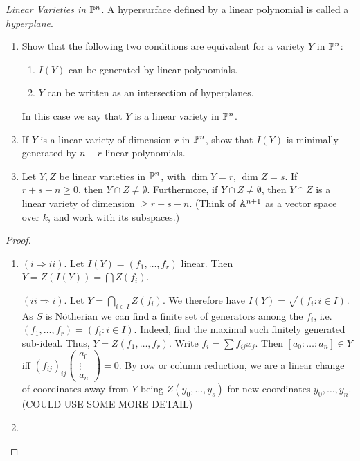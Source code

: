 \label{1.2.11}

\textit{Linear Varieties in} $\P^n$. A hypersurface defined by a linear polynomial is called a \textit{hyperplane}.

\begin{enumerate}[label = (\alph*)]
    \item Show that the following two conditions are equivalent for a variety $Y$ in $\P^n$:
    \begin{enumerate}[label = (\roman*)]
        \item $I(Y)$ can be generated by linear polynomials.
        \item $Y$ can be written as an intersection of hyperplanes.
    \end{enumerate}
    In this case we say that $Y$ is a linear variety in $\P^n$.
    
    \item If $Y$ is a linear variety of dimension $r$ in $\P^n$, show that $I(Y)$ is minimally generated by $n - r$ linear polynomials.
    
    \item Let $Y,Z$ be linear varieties in $\P^n$, with $\dim Y = r$, $\dim Z = s$. If $r + s - n \geq 0$, then $Y \cap Z \neq \emptyset$. Furthermore, if $Y \cap Z \neq \emptyset$, then $Y\cap Z$ is a linear variety of dimension $\geq r + s - n$. (Think of $\A^{n + 1}$ as a vector space over $k$, and work with its subspaces.)
\end{enumerate}

\begin{proof}
    \begin{enumerate}[label=(\alph*)]
        \item $(i \Longrightarrow ii)$. Let $I(Y) = (f_1, \dots, f_r)$ linear. Then $Y = Z(I(Y)) = \bigcap Z(f_i)$.

        $(ii \Longrightarrow i)$. Let $Y = \bigcap_{i \in I} Z(f_i)$. We therefore have $I(Y) = \sqrt{(f_i : i \in I)}$. As $S$ is N\"otherian we can find a finite set of generators among the $f_i$, i.e. $(f_1, \dots, f_r) = (f_i : i \in I)$. Indeed, find the maximal such finitely generated sub-ideal. Thus, $Y = Z(f_1, \dots, f_r)$. Write $f_i = \sum f_{ij} x_j$. Then $[a_0 : \dots : a_n] \in Y$ iff $(f_{ij})_{ij} \begin{pmatrix}
            a_0\\
            \vdots\\
            a_n
        \end{pmatrix} = 0$. By row or column reduction, we are a linear change of coordinates away from $Y$ being $Z(y_0, \dots, y_s)$ for new coordinates $y_0, \dots, y_n$. (COULD USE SOME MORE DETAIL)

        \item 
    \end{enumerate}
\end{proof}
